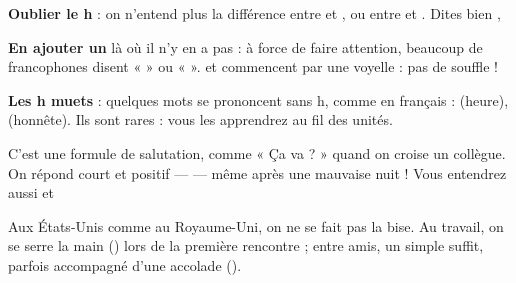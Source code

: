 \begin{attention}
\begin{etapes}
\item \textbf{Oublier le h} : on n'entend plus la différence entre  et , ou entre
   et . Dites bien , 
\item \textbf{En ajouter un} là où il n'y en a pas : à force de faire attention, beaucoup de
  francophones disent «  » ou «  ».  et  commencent par
  une voyelle : pas de souffle !
\item \textbf{Les h muets} : quelques mots se prononcent sans h, comme en français :
    (heure),   (honnête). Ils sont rares :
  vous les apprendrez au fil des unités.
\end{etapes}
\end{attention}


\begin{culture}
\begin{center}
\end{center}
\end{culture}

\begin{paire}
\begin{culture}
C'est une formule de salutation, comme « Ça va ? » quand on croise un collègue. On répond
court et positif —  — même après une mauvaise nuit ! Vous
entendrez aussi  et 
\end{culture}
\begin{culture}
Aux États-Unis comme au Royaume-Uni, on ne se fait pas la bise. Au travail, on se serre la
main () lors de la première rencontre ; entre amis, un simple 
suffit, parfois accompagné d'une accolade ().
\end{culture}
\end{paire}

